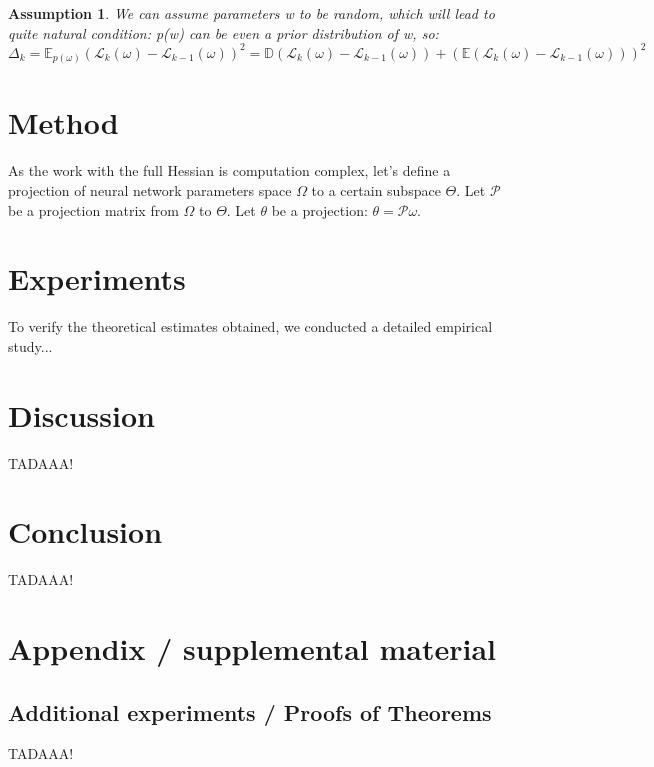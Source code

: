 \documentclass{article}
\newtheorem{assumption}{Assumption}
\begin{document}
\begin{assumption}
  We can assume parameters w to be random, which will lead to quite natural condition: p(w) can be even a prior
  distribution of w, so: $$\Delta_{k} = \mathbb{E}_{p(\omega)} \left( \mathcal{L}_{k}(\omega) - \mathcal{L}_{k-1}(\omega)
    \right)^2 = \mathbb{D} \left( \mathcal{L}_{k}(\omega) - \mathcal{L}_{k-1}(\omega) \right) + \left( \mathbb{E} \left(
      \mathcal{L}_{k}(\omega) - \mathcal{L}_{k-1}(\omega) \right) \right)^2$$
\end{assumption}

\section{Method}\label{sec:method}

As the work with the full Hessian is computation complex, let's define a projection of neural network parameters space
$\Omega$ to a certain subspace $\Theta$. Let $\mathcal{P}$ be a projection matrix from $\Omega$ to $\Theta$. Let $\theta$ be
a projection: $\theta = \mathcal{P}\omega$.

\section{Experiments}\label{sec:exp}

To verify the theoretical estimates obtained, we conducted a detailed empirical study...

\section{Discussion}\label{sec:disc}

TADAAA!

\section{Conclusion}\label{sec:concl}

TADAAA!







\newpage
\appendix
\section{Appendix / supplemental material}\label{app}

\subsection{Additional experiments / Proofs of Theorems}\label{app:exp}

TADAAA!
\end{document}
